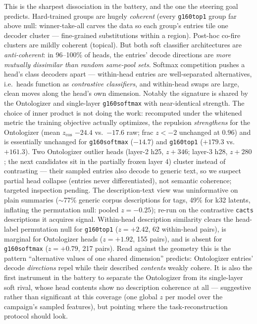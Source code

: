 \documentclass[11pt]{article}
\begin{document}
This is the sharpest dissociation in the battery, and the one the
steering goal predicts. Hard-trained groups are hugely \emph{coherent}
(every \texttt{g160top1} group far above null: winner-take-all carves the
data so each group's entries tile one decoder cluster --- fine-grained
substitutions within a region). Post-hoc co-fire clusters are mildly
coherent (topical). But both soft classifier architectures are
\emph{anti-coherent}: in 96--100\% of heads, the entries' decode
directions are \emph{more mutually dissimilar than random same-pool
sets}. Softmax competition pushes a head's class decoders apart ---
within-head entries are well-separated alternatives, i.e.\ heads function
as \emph{contrastive classifiers}, and within-head swaps are large, clean
moves along the head's own dimension. Notably the signature is shared by
the Ontologizer and single-layer \texttt{g160softmax} with near-identical
strength. The choice of inner product is not doing the work: recomputed
under the whitened metric the training objective actually optimizes, the
repulsion \emph{strengthens} for the Ontologizer (mean $z_{\cos}$
$-24.4$ vs.\ $-17.6$ raw; frac $z{<}{-}2$ unchanged at $0.96$) and is
essentially unchanged for \texttt{g160softmax} ($-14.7$) and
\texttt{g160top1} ($+179.3$ vs.\ $+161.3$). Two Ontologizer outlier heads (layer-2 h25, $z{+}346$; layer-3
h28, $z{+}280$; the next candidates sit in the partially frozen layer 4)
cluster instead of contrasting --- their sampled entries also decode to
generic text, so we suspect partial head collapse (entries never
differentiated), not semantic coherence; targeted inspection pending.
The description-text view was uninformative on plain summaries
($\sim$77\% generic corpus descriptions for tags, 49\% for k32 latents,
inflating the permutation null: pooled $z=-0.25$); re-run on the
contrastive \texttt{cacts} descriptions it acquires signal. Within-head
description similarity clears the head-label permutation null for
\texttt{g160top1} ($z{=}{+}2.42$, 62 within-head pairs), is marginal for
Ontologizer heads ($z{=}{+}1.92$, 155 pairs), and is absent for
\texttt{g160softmax} ($z{=}{+}0.79$, 217 pairs). Read against the
geometry this is the pattern ``alternative values of one shared
dimension'' predicts: Ontologizer entries' decode \emph{directions}
repel while their described \emph{contents} weakly cohere. It is also
the first instrument in the battery to separate the Ontologizer from
its single-layer soft rival, whose head contents show no description
coherence at all --- suggestive rather than significant at this
coverage (one global $z$ per model over the campaign's sampled
features), but pointing where the task-reconstruction protocol should
look.
\end{document}
